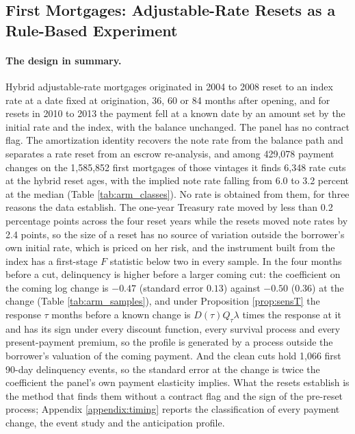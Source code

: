 \subsection{First Mortgages: Adjustable-Rate Resets as a Rule-Based Experiment}\label{sec:armreset}

\paragraph{The design in summary.} Hybrid adjustable-rate mortgages originated in 2004 to 2008 reset to an index rate at a date fixed at origination, 36, 60 or 84 months after opening, and for resets in 2010 to 2013 the payment fell at a known date by an amount set by the initial rate and the index, with the balance unchanged. The panel has no contract flag. The amortization identity recovers the note rate from the balance path and separates a rate reset from an escrow re-analysis, and among 429,078 payment changes on the 1,585,852 first mortgages of those vintages it finds 6,348 rate cuts at the hybrid reset ages, with the implied note rate falling from 6.0 to 3.2 percent at the median (Table \ref{tab:arm_classes}). No rate is obtained from them, for three reasons the data establish. The one-year Treasury rate moved by less than 0.2 percentage points across the four reset years while the resets moved note rates by 2.4 points, so the size of a reset has no source of variation outside the borrower's own initial rate, which is priced on her risk, and the instrument built from the index has a first-stage $F$ statistic below two in every sample. In the four months before a cut, delinquency is higher before a larger coming cut: the coefficient on the coming log change is $-0.47$ (standard error $0.13$) against $-0.50$ ($0.36$) at the change (Table \ref{tab:arm_samples}), and under Proposition \ref{prop:sensT} the response $\tau$ months before a known change is $D(\tau)Q_\tau\lambda$ times the response at it and has its sign under every discount function, every survival process and every present-payment premium, so the profile is generated by a process outside the borrower's valuation of the coming payment. And the clean cuts hold 1,066 first 90-day delinquency events, so the standard error at the change is twice the coefficient the panel's own payment elasticity implies. What the resets establish is the method that finds them without a contract flag and the sign of the pre-reset process; Appendix \ref{appendix:timing} reports the classification of every payment change, the event study and the anticipation profile.

